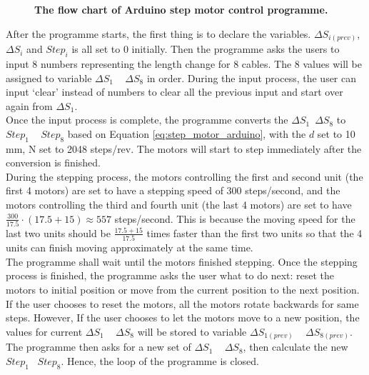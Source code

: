 \begin{itemize}
\begin{figure}[H]
        \caption[The flow chart of Arduino step motor control programme]
        {\centering \textbf{The flow chart of Arduino step motor control programme.}}
        \label{fig:motor_flowchart}
    \end{figure}
    After the programme starts, the first thing is to declare the variables. $\Delta S_{i(prev)}$, $\Delta S_i$ and 
    $Step_i$ is all set to 0 initially. Then the programme asks the users to input 8 numbers representing the 
    length change for 8 cables. The 8 values will be assigned to variable $\Delta S_1$ ~ $\Delta S_8$ in order. 
    During the input process, the user can input `clear' instead of numbers to clear all the previous input and 
    start over again from $\Delta S_1$. \\
    Once the input process is complete, the programme converts the $\Delta S_1$~$\Delta S_8$ to $Step_1$ ~ $Step_8$ 
    based on Equation \ref{eq:step_motor_arduino}, with the $d$ set to 10 mm, N set to 2048 steps/rev. The motors 
    will start to step immediately after the conversion is finished. \\
    During the stepping process, the motors controlling the first and second unit (the first 4 motors) are set 
    to have a stepping speed of 300 steps/second, and the motors controlling the third and fourth unit 
    (the last 4 motors) are set to have $\frac{300}{17.5}\cdot(17.5+15)\approx 557$ steps/second. This is because 
    the moving speed for the last two units should be $\frac{17.5+15}{17.5}$ times faster than the first two units 
    so that the 4 units can finish moving approximately at the same time. \\
    The programme shall wait until the motors finished stepping. Once the stepping process is finished, the programme 
    asks the user what to do next: reset the motors to initial position or move from the current position to the 
    next position. If the user chooses to reset the motors, all the motors rotate backwards for same steps. 
    However, If the user chooses to let the motors move to a new position, the values for current $\Delta S_1$ ~ 
    $\Delta S_8$ will be stored to variable $\Delta S_{1(prev)}$ ~ $\Delta S_{8(prev)}$. The programme then asks for 
    a new set of $\Delta S_1$ ~ $\Delta S_8$, then calculate the new $Step_1$ ~$Step_8$. Hence, the loop of the 
    programme is closed.
\end{itemize}
